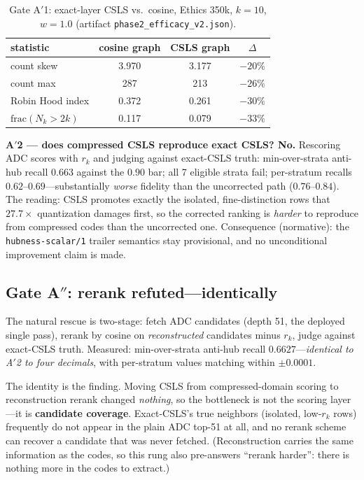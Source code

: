 \documentclass[sigconf, nonacm]{acmart}
\begin{document}
\begin{table}[t]
\caption{Gate A$'$1: exact-layer CSLS vs.\ cosine, Ethics 350k, $k=10$,
$w=1.0$ (artifact \texttt{phase2\_efficacy\_v2.json}).}
\label{tab:a1}
\small
\begin{tabular}{@{}lccc@{}}
\toprule
statistic & cosine graph & CSLS graph & $\Delta$ \\
\midrule
count skew & 3.970 & 3.177 & $-20\%$ \\
count max & 287 & 213 & $-26\%$ \\
Robin Hood index & 0.372 & 0.261 & $-30\%$ \\
$\mathrm{frac}(N_k > 2k)$ & 0.117 & 0.079 & $-33\%$ \\
\bottomrule
\end{tabular}
\end{table}

\textbf{A$'$2 --- does compressed CSLS reproduce exact CSLS? No.}
Rescoring ADC scores with $r_k$ and judging against exact-CSLS truth:
min-over-strata anti-hub recall $0.663$ against the $0.90$ bar; all 7
eligible strata fail; per-stratum recalls $0.62$--$0.69$---substantially
\emph{worse} fidelity than the uncorrected path ($0.76$--$0.84$). The
reading: CSLS promotes exactly the isolated, fine-distinction rows that
$27.7\times$ quantization damages first, so the corrected ranking is
\emph{harder} to reproduce from compressed codes than the uncorrected one.
Consequence (normative): the \texttt{hubness-scalar/1} trailer semantics
stay provisional, and no unconditional improvement claim is made.

\subsection{Gate A$''$: rerank refuted---identically}

The natural rescue is two-stage: fetch ADC candidates (depth 51, the
deployed single pass), rerank by cosine on \emph{reconstructed} candidates
minus $r_k$, judge against exact-CSLS truth. Measured: min-over-strata
anti-hub recall $\mathbf{0.6627}$---\emph{identical to A$'$2 to four
decimals}, with per-stratum values matching within $\pm 0.0001$.

The identity is the finding. Moving CSLS from compressed-domain scoring to
reconstruction rerank changed \emph{nothing}, so the bottleneck is not the
scoring layer---it is \textbf{candidate coverage}. Exact-CSLS's true
neighbors (isolated, low-$r_k$ rows) frequently do not appear in the plain
ADC top-51 at all, and no rerank scheme can recover a candidate that was
never fetched. (Reconstruction carries the same information as the codes,
so this rung also pre-answers ``rerank harder'': there is nothing more in
the codes to extract.)
\end{document}
